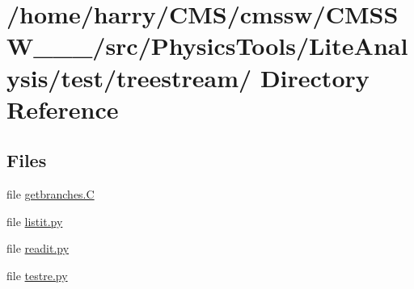 \hypertarget{dir_000007}{
\section{/home/harry/CMS/cmssw/CMSSW\_\_\_/src/Physics\-Tools/Lite\-Analysis/test/treestream/ Directory Reference}
\label{dir_000007}
}


\subsection*{Files}
\begin{CompactItemize}
\item 
file \hyperlink{getbranches_8C}{getbranches.C}
\item 
file \hyperlink{listit_8py}{listit.py}
\item 
file \hyperlink{readit_8py}{readit.py}
\item 
file \hyperlink{testre_8py}{testre.py}
\end{CompactItemize}
